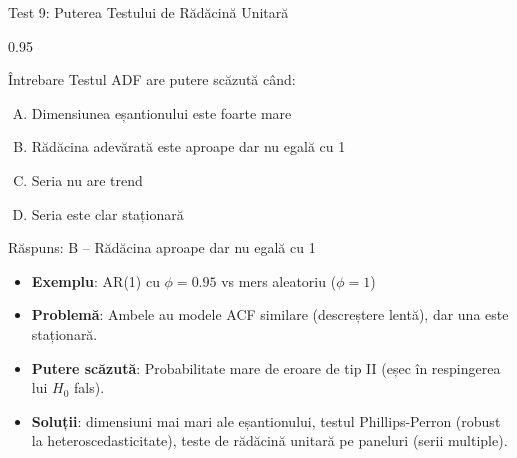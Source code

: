 \documentclass[9pt, aspectratio=169, t]{beamer}
\begin{document}
\begin{frame}{Test 9: Puterea Testului de Rădăcină Unitară}
    \begin{cminipage}{0.95\textwidth}
    \begin{alertblock}{Întrebare}
        Testul ADF are putere scăzută când:
    \end{alertblock}

    \vspace{0.2cm}

    \begin{enumerate}[A)]\setlength{\itemsep}{0pt}
        \item Dimensiunea eșantionului este foarte mare
        \item Rădăcina adevărată este aproape dar nu egală cu 1
        \item Seria nu are trend
        \item Seria este clar staționară
    \end{enumerate}

    \vspace{0.3cm}
    \pause
    \begin{exampleblock}{Răspuns: B -- Rădăcina aproape dar nu egală cu 1}
        \begin{itemize}\setlength{\itemsep}{0pt}
        \item \textbf{Exemplu}: AR(1) cu $\phi = 0.95$ vs mers aleatoriu ($\phi = 1$)
        \item \textbf{Problemă}: Ambele au modele ACF similare (descreștere lentă), dar una este staționară.
        \item \textbf{Putere scăzută}: Probabilitate mare de eroare de tip II (eșec în respingerea lui $H_0$ fals).
        \item \textbf{Soluții}: dimensiuni mai mari ale eșantionului, testul Phillips-Perron (robust la heteroscedasticitate), teste de rădăcină unitară pe paneluri (serii multiple).
        \end{itemize}
    \end{exampleblock}
    \end{cminipage}
\end{frame}
\end{document}
